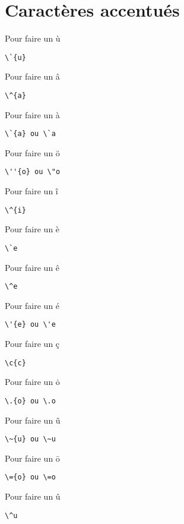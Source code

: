 


\section{Caract\`eres accentu\'es}

Pour faire un \`{u}
\begin{verbatim}
\`{u}
\end{verbatim}


Pour faire un \^{a}
\begin{verbatim}
\^{a}
\end{verbatim}

Pour faire un \`{a}
\begin{verbatim}
\`{a} ou \`a
\end{verbatim}


Pour faire un \"o
\begin{verbatim}
\''{o} ou \"o
\end{verbatim}

Pour faire un \^{i}
\begin{verbatim}
\^{i}
\end{verbatim}

Pour faire un \`e
\begin{verbatim}
\`e
\end{verbatim}

Pour faire un \^e
\begin{verbatim}
\^e
\end{verbatim}

Pour faire un \'{e}
\begin{verbatim}
\'{e} ou \'e
\end{verbatim}

Pour faire un \c{c}
\begin{verbatim}
\c{c}
\end{verbatim}

Pour faire un \.o
\begin{verbatim}
\.{o} ou \.o
\end{verbatim}


Pour faire un \~u
\begin{verbatim}
\~{u} ou \~u
\end{verbatim}

Pour faire un \=o
\begin{verbatim}
\={o} ou \=o
\end{verbatim}


Pour faire un \^u
\begin{verbatim}
\^u
\end{verbatim}

